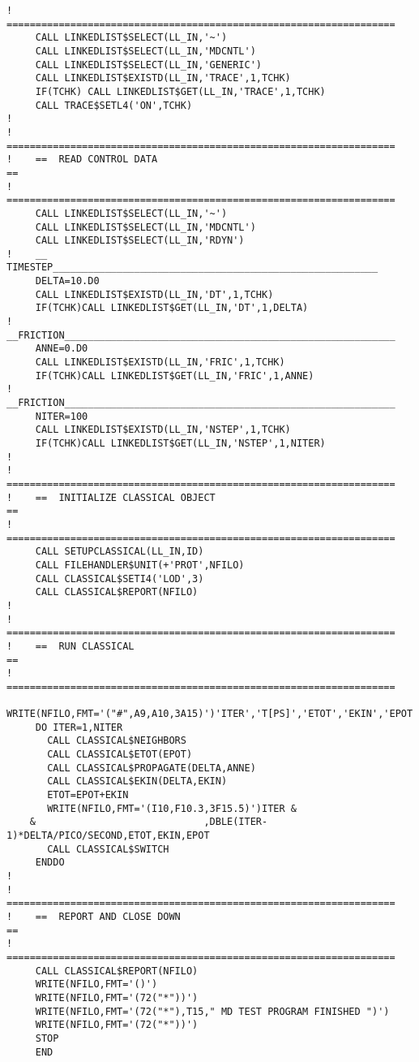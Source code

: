 \documentclass[11pt,a4paper]{report}
\begin{document}
\begin{verbatim}
!    ===================================================================
     CALL LINKEDLIST$SELECT(LL_IN,'~')
     CALL LINKEDLIST$SELECT(LL_IN,'MDCNTL')
     CALL LINKEDLIST$SELECT(LL_IN,'GENERIC')
     CALL LINKEDLIST$EXISTD(LL_IN,'TRACE',1,TCHK)
     IF(TCHK) CALL LINKEDLIST$GET(LL_IN,'TRACE',1,TCHK)
     CALL TRACE$SETL4('ON',TCHK)
!
!    ===================================================================
!    ==  READ CONTROL DATA                                            ==
!    ===================================================================
     CALL LINKEDLIST$SELECT(LL_IN,'~')
     CALL LINKEDLIST$SELECT(LL_IN,'MDCNTL')
     CALL LINKEDLIST$SELECT(LL_IN,'RDYN')
!    __ TIMESTEP________________________________________________________
     DELTA=10.D0
     CALL LINKEDLIST$EXISTD(LL_IN,'DT',1,TCHK)
     IF(TCHK)CALL LINKEDLIST$GET(LL_IN,'DT',1,DELTA)
!    __FRICTION_________________________________________________________
     ANNE=0.D0
     CALL LINKEDLIST$EXISTD(LL_IN,'FRIC',1,TCHK)
     IF(TCHK)CALL LINKEDLIST$GET(LL_IN,'FRIC',1,ANNE)
!    __FRICTION_________________________________________________________
     NITER=100
     CALL LINKEDLIST$EXISTD(LL_IN,'NSTEP',1,TCHK)
     IF(TCHK)CALL LINKEDLIST$GET(LL_IN,'NSTEP',1,NITER)
!
!    ===================================================================
!    ==  INITIALIZE CLASSICAL OBJECT                                  ==
!    ===================================================================
     CALL SETUPCLASSICAL(LL_IN,ID)
     CALL FILEHANDLER$UNIT(+'PROT',NFILO)
     CALL CLASSICAL$SETI4('LOD',3)
     CALL CLASSICAL$REPORT(NFILO)
!
!    ===================================================================
!    ==  RUN CLASSICAL                                                ==
!    ===================================================================
     WRITE(NFILO,FMT='("#",A9,A10,3A15)')'ITER','T[PS]','ETOT','EKIN','EPOT'
     DO ITER=1,NITER
       CALL CLASSICAL$NEIGHBORS
       CALL CLASSICAL$ETOT(EPOT)
       CALL CLASSICAL$PROPAGATE(DELTA,ANNE)
       CALL CLASSICAL$EKIN(DELTA,EKIN)
       ETOT=EPOT+EKIN
       WRITE(NFILO,FMT='(I10,F10.3,3F15.5)')ITER &
    &                             ,DBLE(ITER-1)*DELTA/PICO/SECOND,ETOT,EKIN,EPOT
       CALL CLASSICAL$SWITCH
     ENDDO
!
!    ===================================================================
!    ==  REPORT AND CLOSE DOWN                                        ==
!    ===================================================================
     CALL CLASSICAL$REPORT(NFILO)
     WRITE(NFILO,FMT='()')
     WRITE(NFILO,FMT='(72("*"))')
     WRITE(NFILO,FMT='(72("*"),T15," MD TEST PROGRAM FINISHED ")')
     WRITE(NFILO,FMT='(72("*"))')
     STOP
     END


\end{verbatim}
\end{document}
